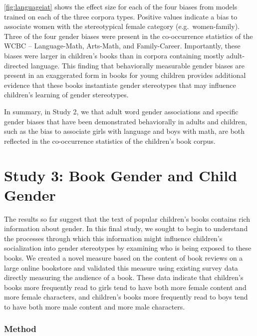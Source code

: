 \documentclass[
  english,
  ,man,floatsintext]{apa6}
\begin{document}
\autoref{fig:languageiat} shows the effect size for each of the four biases from models trained on each of the three corpora types. Positive values indicate a bias to associate women with the stereotypical female category (e.g.~women-family). Three of the four gender biases were present in the co-occurrence statistics of the WCBC -- Language-Math, Arts-Math, and Family-Career. Importantly, these biases were larger in children's books than in corpora containing mostly adult-directed language. This finding that behaviorally measurable gender biases are present in an exaggerated form in books for young children provides additional evidence that these books instantiate gender stereotypes that may influence children's learning of gender stereotypes.

In summary, in Study 2, we that adult word gender associations and specific gender biases that have been demonstrated behaviorally in adults and children, such as the bias to associate girls with language and boys with math, are both reflected in the co-occurrence statistics of the children's book corpus.

\hypertarget{study-3-book-gender-and-child-gender}{%
\section{Study 3: Book Gender and Child Gender}\label{study-3-book-gender-and-child-gender}}

The results so far suggest that the text of popular children's books contains rich information about gender. In this final study, we sought to begin to understand the processes through which this information might influence children's socialization into gender stereotypes by examining who is being exposed to these books. We created a novel measure based on the content of book reviews on a large online bookstore and validated this measure using existing survey data directly measuring the audience of a book. These data indicate that children's books more frequently read to girls tend to have both more female content and more female characters, and children's books more frequently read to boys tend to have both more male content and more male characters.

\hypertarget{method-3}{%
\subsubsection{Method}\label{method-3}}
\end{document}
